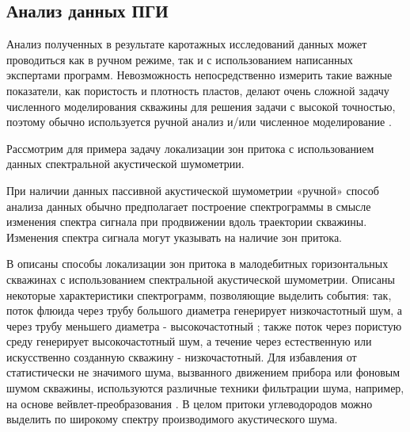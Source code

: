 \subsection{Анализ данных ПГИ}
\par
Анализ полученных в результате каротажных исследований данных может проводиться как в ручном режиме, так и с использованием написанных экспертами программ. Невозможность непосредственно измерить такие важные показатели, как пористость и плотность пластов, делают очень сложной задачу численного моделирования скважины для решения задачи с высокой точностью, поэтому обычно используется ручной анализ и/или численное моделирование \cite{196955}.
\par
Рассмотрим для примера задачу локализации зон притока с использованием данных спектральной акустической шумометрии.
\par
При наличии данных пассивной акустической шумометрии «ручной» способ анализа данных обычно предполагает построение спектрограммы в смысле изменения спектра сигнала при продвижении вдоль траектории скважины. Изменения спектра сигнала могут указывать на наличие зон притока.
\par
В \cite{187909} описаны способы локализации зон притока в малодебитных горизонтальных скважинах с использованием спектральной акустической шумометрии. Описаны некоторые характеристики спектрограмм, позволяющие выделить события: так, поток флюида через трубу большого диаметра генерирует низкочастотный шум, а через трубу меньшего диаметра - высокочастотный \cite{162081}; также поток через пористую среду генерирует высокочастотный шум, а течение через естественную или искусственно созданную скважину - низкочастотный. Для избавления от статистически не значимого шума, вызванного движением прибора или фоновым шумом скважины, используются различные техники фильтрации шума, например, на основе вейвлет-преобразования \cite{162081}. В целом притоки углеводородов можно выделить по широкому спектру производимого акустического шума.


